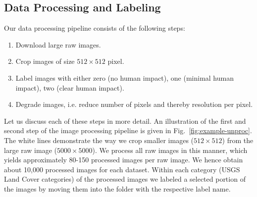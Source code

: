 \subsection{Data Processing and Labeling}
Our data processing pipeline consists of the following steps:
\begin{enumerate}
	\item Download large raw images.
	\item Crop images of size $512\times512$ pixel.
	\item Label images with either zero (no human impact), one (minimal human impact), two (clear human impact).
	\item Degrade images, i.e. reduce number of pixels and thereby resolution per pixel.
\end{enumerate}

Let us discuss each of these steps in more detail. An illustration of the first and second step of the image processing pipeline is given in Fig.~\ref{fig:example-unproc}. The white lines demonstrate the way we crop smaller images ($512\times512$) from the large raw image ($5000\times5000$). We process all raw images in this manner, which yields approximately 80-150 processed images per raw image. We hence obtain about 10,000 processed images for each dataset. Within each category (USGS Land Cover categories) of the processed images we labeled a selected portion of the images by moving them into the folder with the respective label name. 

